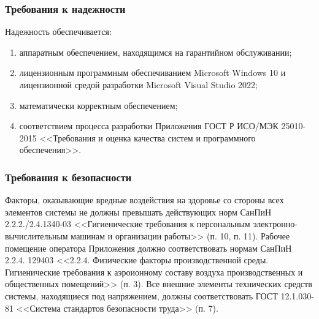 \documentclass[12pt,a4paper]{article}
\begin{document}
\subsubsection{Требования к надежности}
Надежность обеспечивается:
\begin{enumerate}
    \item аппаратным обеспечением, находящимся на гарантийном обслуживании;
    \item лицензионным программным обеспечиванием Microsoft Windows 10 и лицензионной средой разработки Microsoft 
    Visual Studio 2022;
    \item математически корректным обеспечением;
    \item соответствием процесса разработки Приложения ГОСТ Р ИСО/МЭК 25010-2015 <<Требования и оценка качества 
    систем и программного обеспечения>>.
\end{enumerate}



\subsubsection{Требования к безопасности}\label{safety}
Факторы, оказывающие вредные воздействия на здоровье со стороны всех элементов системы не должны превышать 
действующих норм СанПиН 2.2.2./2.4.1340-03 <<Гигиенические требования к персональным 
электронно-вычислительным машинам и организации работы>> (п. 10, п. 11). \medskip \newline
Рабочее помещение оператора Приложения должно соответствовать нормам СанПиН 2.2.4. 129403 <<2.2.4. Физические
факторы производственной среды. Гигиенические требования к аэроионному составу воздуха производственных и общественных
помещений>> (п. 3). \medskip \newline
Все внешние элементы технических средств системы, находящиеся под напряжением, должны соответствовать 
ГОСТ 12.1.030-81 <<Система стандартов безопасности труда>> (п. 7).
\end{document}
